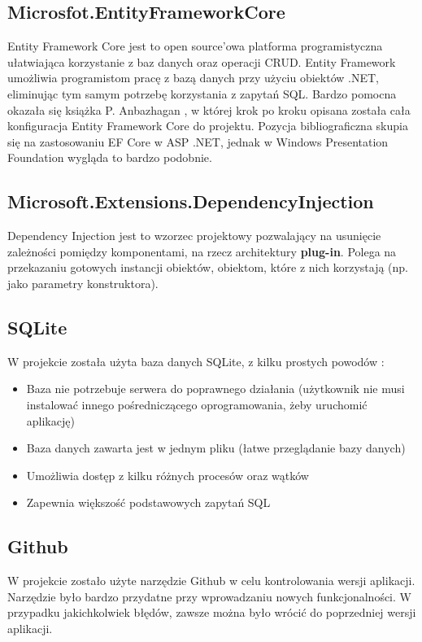 \subsection{Microsfot.EntityFrameworkCore}
Entity Framework Core \cite{EFCore} jest to open source'owa platforma programistyczna ułatwiająca korzystanie z baz danych oraz operacji CRUD. Entity Framework umożliwia programistom pracę z bazą danych przy użyciu obiektów .NET, eliminując tym samym potrzebę korzystania z zapytań SQL. Bardzo pomocna okazała się książka P. Anbazhagan \cite{EFCoreBook}, w której krok po kroku opisana została cała konfiguracja Entity Framework Core do projektu. Pozycja bibliograficzna skupia się na zastosowaniu EF Core w ASP .NET, jednak w Windows Presentation Foundation wygląda to bardzo podobnie.

\subsection{Microsoft.Extensions.DependencyInjection}
Dependency Injection jest to wzorzec projektowy pozwalający na usunięcie zależności pomiędzy komponentami, na rzecz architektury \textbf{plug-in}. Polega na przekazaniu gotowych instancji obiektów, obiektom, które z nich korzystają (np. jako parametry konstruktora).

\subsection{SQLite}
W projekcie została użyta baza danych SQLite, z kilku prostych powodów \cite{UsingSQLite}:
\begin{itemize}
    \item Baza nie potrzebuje serwera do poprawnego działania (użytkownik nie musi instalować innego pośredniczącego oprogramowania, żeby uruchomić aplikację)
    \item Baza danych zawarta jest w jednym pliku (łatwe przeglądanie bazy danych)
    \item Umożliwia dostęp z kilku różnych procesów oraz wątków
    \item Zapewnia większość podstawowych zapytań SQL
\end{itemize}

\subsection{Github}
W projekcie zostało użyte narzędzie Github \cite{GithubBook} w celu kontrolowania wersji aplikacji. Narzędzie było bardzo przydatne przy wprowadzaniu nowych funkcjonalności. W przypadku jakichkolwiek błędów, zawsze można było wrócić do poprzedniej wersji aplikacji.

